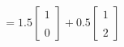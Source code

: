 \documentclass[preview]{standalone}
\begin{document}
\begin{align*}
= 1.5 \begin{bmatrix} 1 \\ \\ 0 \end{bmatrix} + 0.5 \begin{bmatrix} 1 \\ \\ 2 \end{bmatrix}
\end{align*}
\end{document}

